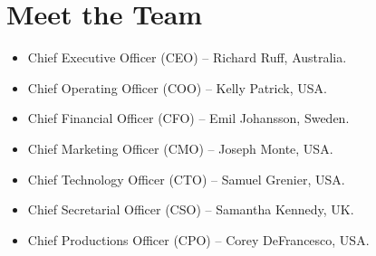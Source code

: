 \documentclass[12pt,a4paper]{article}
\begin{document}
  \section*{Meet the Team}
  \begin{itemize}
    \item{Chief Executive Officer (CEO) – Richard Ruff, Australia.}
    \item{Chief Operating Officer (COO) – Kelly Patrick, USA.}
    \item{Chief Financial Officer (CFO) – Emil Johansson, Sweden.}
    \item{Chief Marketing Officer (CMO) – Joseph Monte, USA.}
    \item{Chief Technology Officer (CTO) – Samuel Grenier, USA.}
    \item{Chief Secretarial Officer (CSO) – Samantha Kennedy, UK.}
    \item{Chief Productions Officer (CPO) – Corey DeFrancesco, USA.}
  \end{itemize}
  \printbibliography{}
\end{document}
